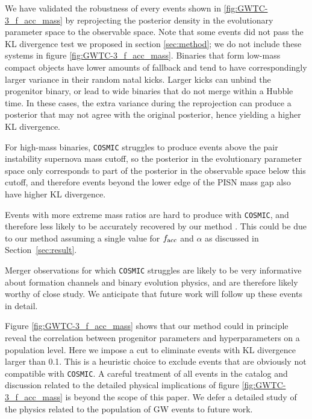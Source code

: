 \documentclass[linenumbers,twocolumn]{aastex631}
\begin{document}
We have validated the robustness of every events shown in
\ref{fig:GWTC-3_f_acc_mass} by reprojecting the posterior density in the
evolutionary parameter space to the observable space. Note that some events did
not pass the KL divergence test we proposed in section \ref{sec:method}; we do
not include these systems in figure \ref{fig:GWTC-3_f_acc_mass}. Binaries that
form low-mass compact objects have lower amounts of fallback and tend to have
correspondingly larger variance in their random natal kicks. Larger kicks can
unbind the progenitor binary, or lead to wide binaries that do not merge within
a Hubble time.  In these cases, the extra variance during the reprojection can
produce a posterior that may not agree with the original posterior, hence
yielding a higher KL divergence.

For high-mass binaries, \texttt{COSMIC} struggles to produce events above the
pair instability supernova mass cutoff, so the posterior in the
evolutionary parameter space only corresponds to part of the posterior in the
observable space below this cutoff, and therefore events beyond the lower edge of the PISN mass
gap also have higher KL divergence.

Events with more extreme mass ratios are hard to produce with \texttt{COSMIC},
and therefore less likely to be accurately recovered by our method
\citep[e.g.][]{Zevin2020}. This could be due to our method assuming a single
value for $f_{\rm acc}$ and $\alpha$ as discussed in Section~\ref{sec:result}.

Merger observations for which \texttt{COSMIC} struggles are likely to be very
informative about formation channels and binary evolution physics, and are
therefore likely worthy of close study.  We anticipate that future work will
follow up these events in detail.

Figure \ref{fig:GWTC-3_f_acc_mass} shows that our method could in principle
reveal the correlation between progenitor parameters and hyperparameters on a
population level. Here we impose a cut to eliminate events with KL divergence
larger than 0.1. This is a heuristic choice to exclude events that are obviously
not compatible with \texttt{COSMIC}. A careful treatment of all events in the
catalog and discussion related to the detailed physical implications of figure
\ref{fig:GWTC-3_f_acc_mass} is beyond the scope of this paper.  We defer a
detailed study of the physics related to the population of GW events to future
work.
\end{document}
